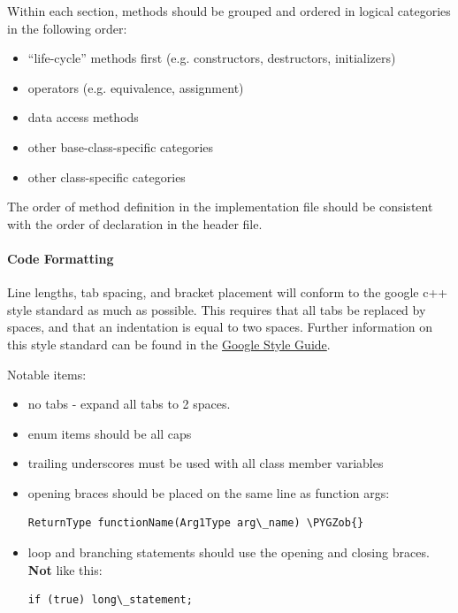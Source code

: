 \documentclass[letterpaper,10pt,english]{sphinxmanual}
\def\PYGZob{\char`\{}
\begin{document}
Within each section, methods should be grouped and ordered in logical
categories in the following order:
\begin{itemize}
\item {} 
``life-cycle'' methods first (e.g. constructors, destructors, initializers)

\item {} 
operators (e.g. equivalence, assignment)

\item {} 
data access methods

\item {} 
other base-class-specific categories

\item {} 
other class-specific categories

\end{itemize}

The order of method definition in the implementation file should be consistent
with the order of declaration in the header file.


\paragraph{Code Formatting}
\label{devdoc/style_guide:code-formatting}
Line lengths, tab spacing, and bracket placement will conform to the google c++
style standard as much as possible. This requires that all tabs be replaced by
spaces, and that an indentation is equal to two spaces. Further information on
this style standard can be found in the \href{http://google-styleguide.googlecode.com/svn/trunk/cppguide.xml}{Google Style Guide}.

Notable items:
\begin{itemize}
\item {} 
no tabs - expand all tabs to 2 spaces.

\item {} 
enum items should be all caps

\item {} 
trailing underscores must be used with all class member variables

\item {} 
opening braces should be placed on the same line as function args:

\begin{Verbatim}[commandchars=\\\{\}]
ReturnType functionName(Arg1Type arg\_name) \PYGZob{}
\end{Verbatim}

\item {} 
loop and branching statements should use the opening and closing braces. \textbf{Not} like this:

\begin{Verbatim}[commandchars=\\\{\}]
if (true) long\_statement;
\end{Verbatim}

\end{itemize}
\end{document}
